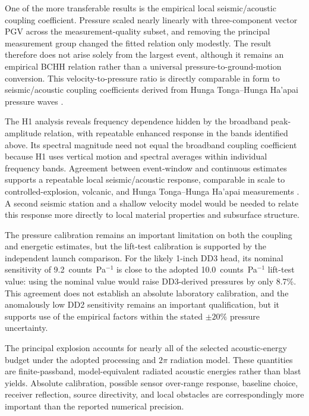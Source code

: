 \documentclass[]{seismica}
\begin{document}
One of the more transferable results is the empirical local
seismic/acoustic coupling coefficient. Pressure scaled nearly linearly with
three-component vector PGV across the measurement-quality subset, and removing
the principal measurement group changed the fitted relation only modestly. The
result therefore does not arise solely from the largest event, although it
remains an empirical BCHH relation rather than a universal
pressure-to-ground-motion conversion. This velocity-to-pressure ratio is
directly comparable in form to seismic/acoustic coupling coefficients derived
from Hunga Tonga--Hunga Ha'apai pressure waves
\citep{anthony_hunga_coupling_2023,macpherson_hunga_coupling_2025}.

The H1 analysis reveals frequency dependence hidden by the broadband
peak-amplitude relation, with repeatable enhanced response in the bands
identified above. Its spectral magnitude need not equal the broadband coupling
coefficient because H1 uses vertical motion and spectral averages within
individual frequency bands. Agreement between event-window and continuous
estimates supports a repeatable local seismic/acoustic response, comparable in
scale to controlled-explosion, volcanic, and Hunga Tonga--Hunga Ha'apai
measurements \citep{novoselov_ground_coupling_2020,anthony_hunga_coupling_2023,
macpherson_hunga_coupling_2025}. A second seismic station and a shallow
velocity model would be needed to relate this response more directly to local
material properties and subsurface structure.

The pressure calibration remains an important limitation on both the
coupling and energetic estimates, but the lift-test calibration is supported
by the independent launch comparison. For the likely 1-inch DD3 head, its
nominal sensitivity of 9.2~counts~Pa$^{-1}$ is close to the adopted
10.0~counts~Pa$^{-1}$ lift-test value: using the nominal value would raise
DD3-derived pressures by only 8.7\%. This agreement does not establish an
absolute laboratory calibration, and the anomalously low DD2 sensitivity
remains an important qualification, but it supports use of the empirical
factors within the stated $\pm20\%$ pressure uncertainty.

The principal explosion accounts for nearly all of the selected
acoustic-energy budget under the adopted processing and $2\pi$ radiation
model. These quantities are finite-passband, model-equivalent radiated acoustic
energies rather than blast yields. Absolute calibration, possible sensor
over-range response, baseline choice, receiver reflection, source directivity,
and local obstacles are correspondingly more important than the reported
numerical precision.
\end{document}

